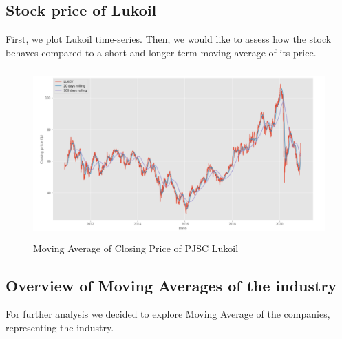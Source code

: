 \documentclass [a4paper, 11pt] {article}
\begin{document}
\subsection {Stock price of Lukoil}
First, we plot Lukoil time-series. Then, we would like to assess how the stock behaves compared to a short and longer term moving average of its price.
\begin{figure}[h]
\caption{Moving Average of Closing Price of PJSC Lukoil}
\includegraphics[height=6.5cm]{LUKOIL_MA}

\end{figure}

\clearpage

\subsection {Overview of Moving Averages of the industry}
For further analysis we decided to explore Moving Average of the companies, representing the industry.
\end{document}
